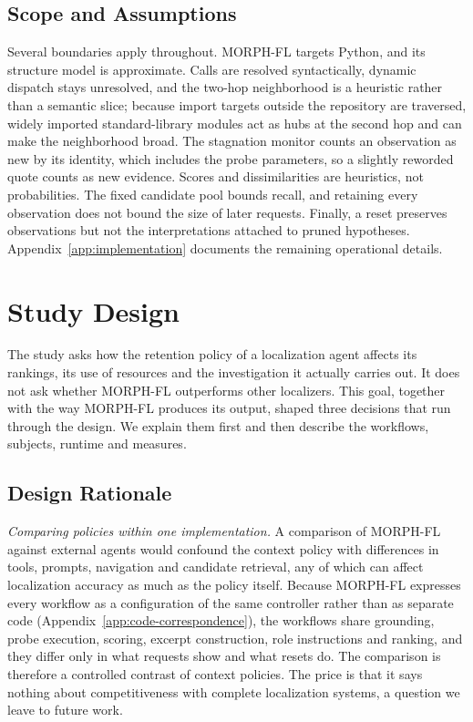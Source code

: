 \documentclass[a4paper,fleqn]{cas-sc}
\newcommand{\tool}{MORPH-FL}
\begin{document}
\subsection{Scope and Assumptions}\label{sec:scope}
Several boundaries apply throughout. \tool{} targets Python, and its structure model is approximate. Calls are resolved syntactically, dynamic dispatch stays unresolved, and the two-hop neighborhood is a heuristic rather than a semantic slice; because import targets outside the repository are traversed, widely imported standard-library modules act as hubs at the second hop and can make the neighborhood broad. The stagnation monitor counts an observation as new by its identity, which includes the probe parameters, so a slightly reworded quote counts as new evidence. Scores and dissimilarities are heuristics, not probabilities. The fixed candidate pool bounds recall, and retaining every observation does not bound the size of later requests. Finally, a reset preserves observations but not the interpretations attached to pruned hypotheses. Appendix~\ref{app:implementation} documents the remaining operational details.

\section{Study Design}\label{sec:study}
The study asks how the retention policy of a localization agent affects its rankings, its use of resources and the investigation it actually carries out. It does not ask whether \tool{} outperforms other localizers. This goal, together with the way \tool{} produces its output, shaped three decisions that run through the design. We explain them first and then describe the workflows, subjects, runtime and measures.

\subsection{Design Rationale}\label{sec:rationale}
\emph{Comparing policies within one implementation.} A comparison of \tool{} against external agents would confound the context policy with differences in tools, prompts, navigation and candidate retrieval, any of which can affect localization accuracy as much as the policy itself. Because \tool{} expresses every workflow as a configuration of the same controller rather than as separate code (Appendix~\ref{app:code-correspondence}), the workflows share grounding, probe execution, scoring, excerpt construction, role instructions and ranking, and they differ only in what requests show and what resets do. The comparison is therefore a controlled contrast of context policies. The price is that it says nothing about competitiveness with complete localization systems, a question we leave to future work.
\end{document}
